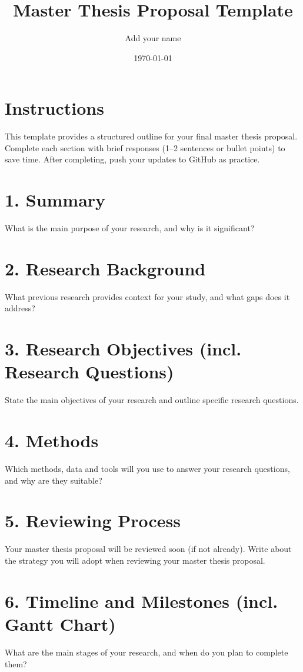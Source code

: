 \documentclass[a4paper,12pt]{article}
\title{Master Thesis Proposal Template}
\author{Add your name}
\date{\today}
\begin{document}
\maketitle

\section*{Instructions}
This template provides a structured outline for your final master thesis proposal. Complete each section with brief responses (1–2 sentences or bullet points) to save time. After completing, push your updates to GitHub as practice.

\section{1. Summary}
What is the main purpose of your research, and why is it significant?\\

\section{2. Research Background}
What previous research provides context for your study, and what gaps does it address?\\

\section{3. Research Objectives (incl. Research Questions)}
State the main objectives of your research and outline specific research questions.

\section{4. Methods}
Which methods, data and tools will you use to answer your research questions, and why are they suitable?\\

\section{5. Reviewing Process }
Your master thesis proposal will be reviewed soon (if not already). Write about the strategy you will adopt when reviewing your master thesis proposal.\\

\section{6. Timeline and Milestones (incl. Gantt Chart)}
What are the main stages of your research, and when do you plan to complete them?\\
\end{document}
